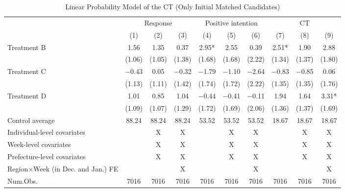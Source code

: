\documentclass[12pt, a4paper]{article}
\begin{document}
\begin{table}[H]

\caption{\label{tab:lm-reply-test-initial-matched}Linear Probability Model of the CT (Only Initial Matched Candidates)}
\centering
\fontsize{8}{10}\selectfont
\begin{threeparttable}
\begin{tabular}[t]{lccccccccc}
\toprule
\multicolumn{1}{c}{ } & \multicolumn{3}{c}{Response} & \multicolumn{3}{c}{Positive intention} & \multicolumn{3}{c}{CT} \\
\cmidrule(l{3pt}r{3pt}){2-4} \cmidrule(l{3pt}r{3pt}){5-7} \cmidrule(l{3pt}r{3pt}){8-10}
  & (1) & (2) & (3) & (4) & (5) & (6) & (7) & (8) & (9)\\
\midrule
Treatment B & \num{1.56} & \num{1.35} & \num{0.37} & \num{2.95}* & \num{2.55} & \num{0.39} & \num{2.51}* & \num{1.90} & \num{2.88}\\
 & (\num{1.06}) & (\num{1.05}) & (\num{1.38}) & (\num{1.68}) & (\num{1.68}) & (\num{2.22}) & (\num{1.34}) & (\num{1.37}) & (\num{1.80})\\
Treatment C & \num{-0.43} & \num{0.05} & \num{-0.32} & \num{-1.79} & \num{-1.10} & \num{-2.64} & \num{-0.83} & \num{-0.85} & \num{0.06}\\
 & (\num{1.13}) & (\num{1.11}) & (\num{1.42}) & (\num{1.74}) & (\num{1.72}) & (\num{2.22}) & (\num{1.35}) & (\num{1.35}) & (\num{1.76})\\
Treatment D & \num{1.01} & \num{0.85} & \num{1.04} & \num{-0.44} & \num{-0.41} & \num{-0.11} & \num{1.94} & \num{1.64} & \num{3.31}*\\
 & (\num{1.09}) & (\num{1.07}) & (\num{1.29}) & (\num{1.72}) & (\num{1.69}) & (\num{2.06}) & (\num{1.36}) & (\num{1.37}) & (\num{1.69})\\
\midrule
Control average & 88.24 & 88.24 & 88.24 & 53.52 & 53.52 & 53.52 & 18.67 & 18.67 & 18.67\\
Individual-level covariates &  & X & X &  & X & X &  & X & X\\
Week-level covariates &  & X & X &  & X & X &  & X & X\\
Prefecture-level covariates &  & X & X &  & X & X &  & X & X\\
Region$\times$Week (in Dec. and Jan.) FE &  &  & X &  &  & X &  &  & X\\
Num.Obs. & \num{7016} & \num{7016} & \num{7016} & \num{7016} & \num{7016} & \num{7016} & \num{7016} & \num{7016} & \num{7016}\\
\bottomrule
\end{tabular}

\end{threeparttable}
\end{table}
\end{document}
